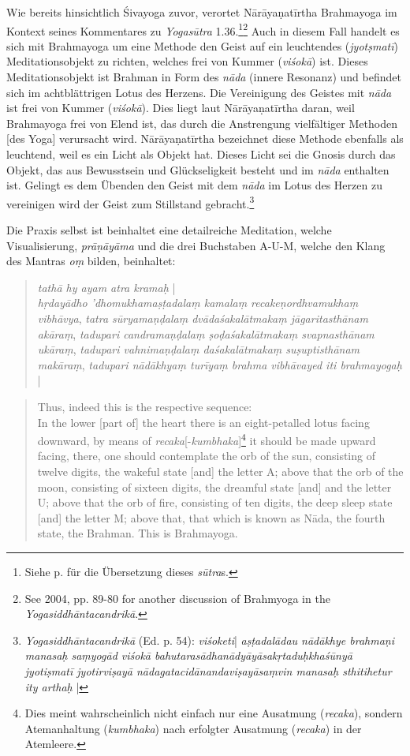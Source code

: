 Wie bereits hinsichtlich Śivayoga zuvor, verortet Nārāyaṇatīrtha Brahmayoga im Kontext seines Kommentares zu \textit{Yogasūtra} 1.36.\footnote{Siehe p. \pageref{sivayogacandri} für die Übersetzung dieses \textit{sūtra}s.}\footnote{See \citeauthor{penna2004} 2004, pp. 89-80 for another discussion of Brahmyoga in the \textit{Yogasiddhāntacandrikā}.} Auch in diesem Fall handelt es sich mit Brahmayoga um eine Methode den Geist auf ein leuchtendes (\textit{jyotṣmatī}) Meditationsobjekt zu richten, welches frei von Kummer (\textit{viśokā}) ist. Dieses Meditationsobjekt ist Brahman in Form des \textit{nāda} (innere Resonanz) und befindet sich im achtblättrigen Lotus des Herzens. Die Vereinigung des Geistes mit \textit{nāda} ist frei von Kummer (\textit{viśokā}). Dies liegt laut Nārāyaṇatīrtha daran, weil Brahmayoga frei von Elend ist, das durch die Anstrengung vielfältiger Methoden [des Yoga] verursacht wird. Nārāyaṇatīrtha bezeichnet diese Methode ebenfalls als leuchtend, weil es ein Licht als Objekt hat. Dieses Licht sei die Gnosis durch das Objekt, das aus Bewusstsein und Glückseligkeit besteht und im \textit{nāda} enthalten ist. Gelingt es dem Übenden den Geist mit dem \textit{nāda} im Lotus des Herzen zu vereinigen wird der Geist zum Stillstand gebracht.\footnote{\textit{Yogasiddhāntacandrikā} (Ed. p. 54): \textit{viśoketi}| \textit{aṣṭadalādau nādākhye brahmaṇi manasaḥ saṃyogād viśokā bahutarasādhanādyāyāsakṛtaduḥkhaśūnyā jyotiṣmatī jyotirviṣayā nādagatacidānandaviṣayāsaṃvin manasaḥ sthitihetur ity arthaḥ} |} 

Die Praxis selbst ist beinhaltet eine detailreiche Meditation, welche Visualisierung, \textit{prāṇāyāma} und die drei Buchstaben A-U-M, welche den Klang des Mantras \textit{oṃ} bilden, beinhaltet:

\begin{quote}
\textit{tathā hy ayam atra kramaḥ} |\\ \textit{hṛdayādho 'dhomukhamaṣṭadalaṃ kamalaṃ recakeṇordhvamukhaṃ vibhāvya}, \textit{tatra sūryamaṇḍalaṃ dvādaśakalātmakaṃ jāgaritasthānam akāraṃ},
\textit{tadupari candramaṇḍalaṃ ṣoḍaśakalātmakaṃ svapnasthānam ukāraṃ}, \textit{tadupari vahnimaṇḍalaṃ daśakalātmakaṃ suṣuptisthānam makāraṃ}, \textit{tadupari nādākhyaṃ turīyaṃ brahma vibhāvayed iti brahmayogaḥ} |
\end{quote}
\begin{quote}
Thus, indeed this is the respective sequence: \\
In the lower [part of] the heart there is an eight-petalled lotus facing downward, by means of \textit{recaka}[-\textit{kumbhaka}]\footnote{Dies meint wahrscheinlich nicht einfach nur eine Ausatmung (\textit{recaka}), sondern Atemanhaltung (\textit{kumbhaka}) nach erfolgter Ausatmung (\textit{recaka}) in der Atemleere.} it should be made upward facing, there, one should contemplate the orb of the sun, consisting of twelve digits, the wakeful state [and] the letter A; above that the orb of the moon, consisting of sixteen digits, the dreamful state [and] and the letter U; above that the orb of fire, consisting of ten digits, the deep sleep state [and] the letter M; above that, that which is known as Nāda, the fourth state, the Brahman. This is Brahmayoga. 
\end{quote}

